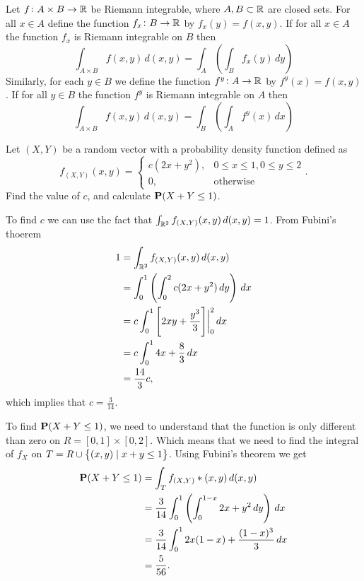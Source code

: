 \documentclass[11pt,a4paper]{article}
\begin{document}
  \begin{theorem}
    Let $f \colon A \times B \to \mathbb{R}$ be Riemann integrable, where 
    $A,B \subset \mathbb{R}$ are closed sets.
    For all $x \in A$ define the function $f_x \colon B \to \mathbb{R}$ by
    $f_x(y) = f(x,y)$.
    If for all $x \in A$ the function $f_x$ is Riemann integrable on $B$
    then
    \[
      \int_{A \times B} f(x,y)\,d(x,y) =
      \int_{A}\left(\int_{B} f_x(y)\,dy\right)
    \]
    Similarly, for each $y \in B$ we define the function 
    $f^y \colon A \to \mathbb{R}$ by $f^y(x) = f(x,y)$.
    If for all $y \in B$ the function $f^y$ is Riemann integrable on $A$
    then
    \[
      \int_{A \times B} f(x,y)\,d(x,y) =
      \int_{B}\left(\int_{A} f^y(x)\,dx\right)
    \]
  \end{theorem}
  \begin{example}
    Let $(X,Y)$ be a random vector with a probability density function
    defined as
    \[
      f_{(X,Y)}(x,y) =
      \begin{cases}
        c(2x+y^2), & 0 \le x \le 1, 0 \le y \le 2 \\
        0, &\text{otherwise}
      \end{cases}.
    \]
    Find the value of $c$, and calculate $\mathbf{P}(X + Y \le 1)$.

    To find $c$ we can use the fact that 
    $\int_{\mathbb{R}^2} f_{(X,Y)}(x,y)\,d(x,y) = 1$.
    From Fubini's thoerem
    \begin{align*}
      1 &= \int_{\mathbb{R}^2} f_{(X,Y)}(x,y)\,d(x,y) \\
      &= \int_{0}^{1}\left(\int_{0}^{2} c(2x + y^2)\,dy\right)\,dx \\
      &= c \int_{0}^{1} \left[2xy + \frac{y^3}{3}\right]\biggr\vert^2_0\,dx \\
      &= c \int_{0}^{1} 4x + \frac{8}{3}\,dx \\
      &= \frac{14}{3}c,
    \end{align*}
    which implies that $c = \frac{3}{14}$.

    To find $\mathbf{P}(X + Y \le 1)$, we need to understand that the function
    is only different than zero on $R = [0,1] \times [0,2]$. Which means that
    we need to find the integral of $f_X$ on 
    $T = R \cup \set{(x,y) \mid x + y \le 1}$. 
    Using Fubini's theorem we get
    \begin{align*}
      \mathbf{P}(X + Y \le 1) &= \int_{T}f_{(X,Y)}*(x,y)\,d(x,y) \\
      &= \frac{3}{14} \int_{0}^{1} 
      \left(\int_{0}^{1-x} 2x + y^2\,dy\right)\,dx \\
      &= {\frac{3}{14}}\int_{0}^{1}2x(1-x)+{\frac{(1-x)^{3}}{3}}\,dx \\
      &= {\frac{5}{56}}.
    \end{align*}
  \end{example}
\end{document}
